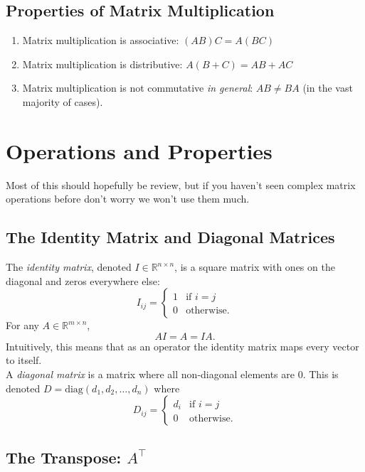 \documentclass{article}
\newcommand{\1}{\mathbf{1}}
\newcommand{\0}{\mathbf{0}}
\newcommand{\RR}{\mathbb{R}}
\newcommand{\T}{\top}
\begin{document}
\subsection{Properties of Matrix Multiplication}

\begin{enumerate}[-]
    \item Matrix multiplication is associative: $(AB)C = A(BC)$
    \item Matrix multiplication is distributive: $A(B+C) = AB + AC$
    \item Matrix multiplication is not commutative \textit{in general}:
        $AB \neq BA$ (in the vast majority of cases).
\end{enumerate}

\section{Operations and Properties}

Most of this should hopefully be review, but if you haven't seen complex matrix operations
before don't worry we won't use them much.

\subsection{The Identity Matrix and Diagonal Matrices}

The \textit{identity matrix}, denoted $I\in\RR^{n\times n}$, is a square matrix
with ones on the diagonal and zeros everywhere else:
\[
    I_{ij} = \begin{cases} 1 & \text{if $i=j$}\\
        0 & \text{otherwise.}
    \end{cases}
\]
For any $A\in\RR^{m\times n}$,
\[
    AI = A = IA.
\]
Intuitively, this means that as an operator the identity matrix maps every
vector to itself.\\

A \textit{diagonal matrix} is a matrix where all non-diagonal elements are 0.
This is denoted $D=\mathrm{diag}(d_1,d_2,\dots,d_n)$ where
\[
    D_{ij} = \begin{cases}
        d_i & \text{if $i=j$}\\
        0 & \text{otherwise.}
    \end{cases}
\]

\subsection{The Transpose: $A^\T$}
\end{document}
